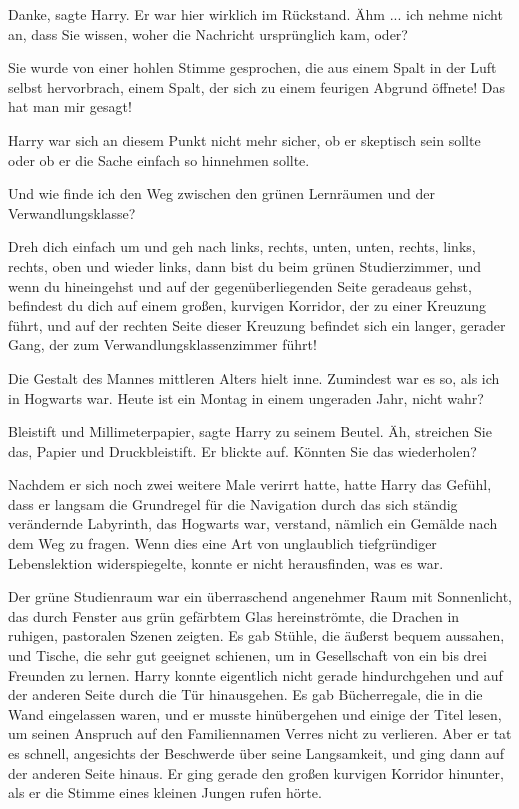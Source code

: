 \glqq{}Danke\grqq{}, sagte Harry. Er war hier wirklich im Rückstand. \glqq{}Ähm ...
ich nehme nicht an, dass Sie wissen, woher die Nachricht ursprünglich kam,
oder?\grqq{}

\glqq{}Sie wurde von einer hohlen Stimme gesprochen, die aus einem Spalt in der
Luft selbst hervorbrach, einem Spalt, der sich zu einem feurigen Abgrund
öffnete! Das hat man mir gesagt!\grqq{}

Harry war sich an diesem Punkt nicht mehr sicher, ob er skeptisch sein sollte
oder ob er die Sache einfach so hinnehmen sollte.

\glqq{}Und wie finde ich den Weg zwischen den grünen Lernräumen und der
Verwandlungsklasse?\grqq{}

\glqq{}Dreh dich einfach um und geh nach links, rechts, unten, unten, rechts,
links, rechts, oben und wieder links, dann bist du beim grünen Studierzimmer,
und wenn du hineingehst und auf der gegenüberliegenden Seite geradeaus gehst,
befindest du dich auf einem großen, kurvigen Korridor, der zu einer Kreuzung
führt, und auf der rechten Seite dieser Kreuzung befindet sich ein langer,
gerader Gang, der zum Verwandlungsklassenzimmer führt!\grqq{}

Die Gestalt des Mannes mittleren Alters hielt inne. \glqq{}Zumindest war es so,
als ich in Hogwarts war. Heute ist ein Montag in einem ungeraden Jahr, nicht
wahr?\grqq{}

\glqq{}Bleistift und Millimeterpapier\grqq{}, sagte Harry zu seinem Beutel. \glqq{}
Äh, streichen Sie das, Papier und Druckbleistift.\grqq{} Er blickte auf. \glqq{}
Könnten Sie das wiederholen?\grqq{}

Nachdem er sich noch zwei weitere Male verirrt hatte, hatte Harry das Gefühl,
dass er langsam die Grundregel für die Navigation durch das sich ständig
verändernde Labyrinth, das Hogwarts war, verstand, nämlich ein Gemälde nach dem
Weg zu fragen. Wenn dies eine Art von unglaublich tiefgründiger Lebenslektion
widerspiegelte, konnte er nicht herausfinden, was es war.

Der grüne Studienraum war ein überraschend angenehmer Raum mit Sonnenlicht, das
durch Fenster aus grün gefärbtem Glas hereinströmte, die Drachen in ruhigen,
pastoralen Szenen zeigten. Es gab Stühle, die äußerst bequem aussahen, und
Tische, die sehr gut geeignet schienen, um in Gesellschaft von ein bis drei
Freunden zu lernen. Harry konnte eigentlich nicht gerade hindurchgehen und auf
der anderen Seite durch die Tür hinausgehen. Es gab Bücherregale, die in die
Wand eingelassen waren, und er musste hinübergehen und einige der Titel lesen,
um seinen Anspruch auf den Familiennamen Verres nicht zu verlieren. Aber er tat
es schnell, angesichts der Beschwerde über seine Langsamkeit, und ging dann auf
der anderen Seite hinaus. Er ging gerade den \glqq{}großen kurvigen
Korridor\grqq{} hinunter, als er die Stimme eines kleinen Jungen rufen hörte.

